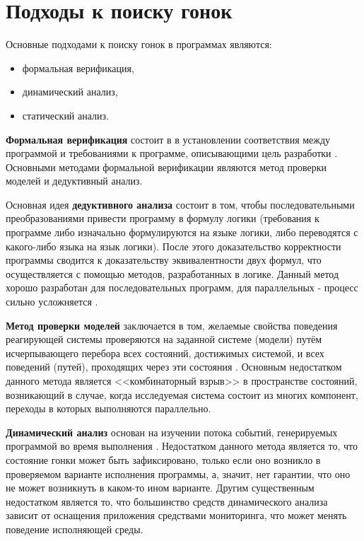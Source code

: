 \chapter{Подходы к поиску гонок}
\label{cha:methods}

Основные подходами к поиску гонок в программах являются:
\begin{itemize}
\item формальная верификация,
\item динамический анализ,
\item статический анализ.
\end{itemize}

\textbf{Формальная верификация} состоит в в установлении соответствия между программой и требованиями к программе, описывающими цель разработки \cite{kropacheva-formal-verification}. Основными методами формальной верификации являются метод проверки моделей и дедуктивный анализ.

Основная идея \textbf{дедуктивного анализа} состоит в том, чтобы последовательными преобразованиями привести программу в формулу логики (требования к программе либо изначально формулируются на языке логики, либо переводятся с какого-либо языка на язык логики). После этого доказательство корректности программы сводится к доказательству эквивалентности двух формул, что осуществляется с помощью методов, разработанных в логике. Данный метод хорошо разработан для последовательных программ, для параллельных - процесс сильно усложняется \cite{kropacheva-formal-verification}.

\textbf{Метод проверки моделей} заключается в том, желаемые свойства поведения реагирующей системы проверяются на заданной системе (модели) путём исчерпывающего перебора всех состояний, достижимых системой, и всех поведений (путей), проходящих через эти состояния \cite{klark-model-checking}. Основным недостатком данного метода является <<комбинаторный взрыв>> в пространстве состояний, возникающий в случае, когда исследуемая система состоит из многих компонент, переходы в которых выполняются параллельно.

\textbf{Динамический анализ} основан на изучении потока событий, генерируемых программой во время выполнения \cite{kovega-dynamic-analysis}. Недостатком данного метода является то, что состояние гонки может быть зафиксировано, только если оно возникло в проверяемом варианте исполнения программы, а, значит, нет гарантии, что оно не может возникнуть в каком-то ином варианте. Другим существенным недостатком является то, что большинство средств динамического анализа зависит от оснащения приложения средствами мониторинга, что может менять поведение исполняющей среды.

